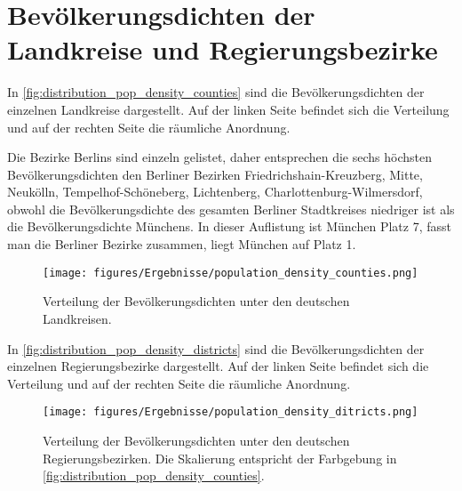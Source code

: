 \section{Bevölkerungsdichten der Landkreise und Regierungsbezirke}
In \autoref{fig:distribution_pop_density_counties} sind die Bevölkerungsdichten der einzelnen Landkreise dargestellt. Auf der linken Seite befindet sich die Verteilung und auf der rechten Seite die räumliche Anordnung.

Die Bezirke Berlins sind einzeln gelistet, daher entsprechen die sechs höchsten Bevölkerungsdichten den Berliner Bezirken  Friedrichshain-Kreuzberg, Mitte, Neukölln, Tempelhof-Schöneberg, Lichtenberg, Charlottenburg-Wilmersdorf, obwohl die Bevölkerungsdichte des gesamten Berliner Stadtkreises niedriger ist als die Bevölkerungsdichte Münchens. In dieser Auflistung ist München Platz 7, fasst man die Berliner Bezirke zusammen, liegt München auf Platz 1.

\begin{figure}[H]
    \centering
    \texttt{[image: figures/Ergebnisse/population\_density\_counties.png]}
    \caption{Verteilung der Bevölkerungsdichten unter den deutschen Landkreisen.}
    \label{fig:distribution_pop_density_counties}
\end{figure}

In \autoref{fig:distribution_pop_density_districts} sind die Bevölkerungsdichten der einzelnen Regierungsbezirke dargestellt. Auf der linken Seite befindet sich die Verteilung und auf der rechten Seite die räumliche Anordnung.

\begin{figure}[H]
    \centering
    \texttt{[image: figures/Ergebnisse/population\_density\_ditricts.png]}
    \caption{Verteilung der Bevölkerungsdichten unter den deutschen Regierungsbezirken. Die Skalierung entspricht der Farbgebung in \autoref{fig:distribution_pop_density_counties}.}
    \label{fig:distribution_pop_density_districts}
\end{figure}